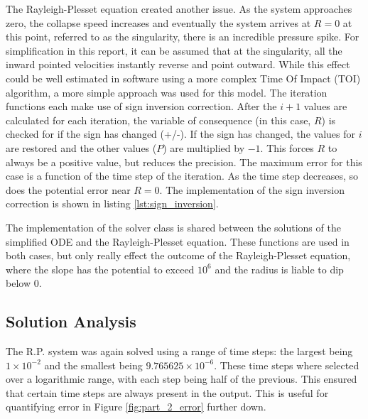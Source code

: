 \documentclass[12pt]{article}
\begin{document}
The Rayleigh-Plesset equation created another issue. As the system approaches zero, the collapse speed increases and eventually the system arrives at $R=0$ at this point, referred to as the singularity, there is an incredible pressure spike. For simplification in this report, it can be assumed that at the singularity, all the inward pointed velocities instantly reverse and point outward. While this effect could be well estimated in software using a more complex Time Of Impact (TOI) algorithm, a more simple approach was used for this model. The iteration functions each make use of sign inversion correction. After the $i+1$ values are calculated for each iteration, the variable of consequence (in this case, $R$) is checked for if the sign has changed (+/-). If the sign has changed, the values for $i$ are restored and the other values ($P$) are multiplied by $-1$. This forces $R$ to always be a positive value, but reduces the precision. The maximum error for this case is a function of the time step of the iteration. As the time step decreases, so does the potential error near $R=0$. The implementation of the sign inversion correction is shown in listing \ref{lst:sign_inversion}.



The implementation of the solver class is shared between the solutions of the simplified ODE and the Rayleigh-Plesset equation. These functions are used in both cases, but only really effect the outcome of the Rayleigh-Plesset equation, where the slope has the potential to exceed $10^6$ and the radius is liable to dip below 0.

\subsection{Solution Analysis}

The R.P. system was again solved using a range of time steps: the largest being $1\times10^{-2}$ and the smallest being $9.765625\times10^{-6}$. These time steps where selected over a logarithmic range, with each step being half of the previous. This ensured that certain time steps are always present in the output. This is useful for quantifying error in Figure \ref{fig:part_2_error} further down.
\end{document}
